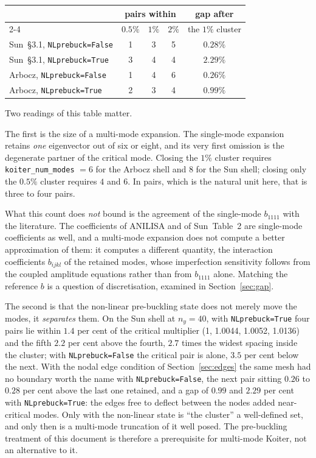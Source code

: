 \documentclass[11pt,a4paper]{article}
\begin{document}
\begin{center}
\begin{tabular}{lcccc}
\toprule
 & \multicolumn{3}{c}{pairs within} & gap after \\
\cmidrule(lr){2-4}
 & $0.5\%$ & $1\%$ & $2\%$ & the $1\%$ cluster \\
\midrule
Sun~\S3.1, \texttt{NLprebuck=False}    & 1 & 3 & 5 & $0.28\%$ \\
Sun~\S3.1, \texttt{NLprebuck=True}     & 3 & 4 & 4 & $2.29\%$ \\
Arbocz, \texttt{NLprebuck=False}       & 1 & 4 & 6 & $0.26\%$ \\
Arbocz, \texttt{NLprebuck=True}        & 2 & 3 & 4 & $0.99\%$ \\
\bottomrule
\end{tabular}
\end{center}

Two readings of this table matter.

The first is the size of a multi-mode expansion.  The single-mode expansion
retains \emph{one} eigenvector out of six or eight, and its very first
omission is the degenerate partner of the critical mode.  Closing the $1\%$
cluster requires \texttt{koiter\_num\_modes} $= 6$ for the Arbocz shell and
$8$ for the Sun shell; closing only the $0.5\%$ cluster requires $4$ and $6$.
In pairs, which is the natural unit here, that is three to four pairs.

What this count does \emph{not} bound is the agreement of the single-mode
$b_{1111}$ with the literature.  The coefficients of ANILISA and of Sun~Table~2
are single-mode coefficients as well, and a multi-mode expansion does not
compute a better approximation of them: it computes a different quantity, the
interaction coefficients $b_{ijkl}$ of the retained modes, whose
imperfection sensitivity follows from the coupled amplitude equations rather
than from $b_{1111}$ alone.  Matching the reference $b$ is a question of
discretisation, examined in Section~\ref{sec:gap}.

The second is that the non-linear pre-buckling state does not merely move the
modes, it \emph{separates} them.  On the Sun shell at $n_y = 40$, with
\texttt{NLprebuck=True} four pairs lie within $1.4$ per cent of the critical
multiplier (1, 1.0044, 1.0052, 1.0136) and the fifth $2.2$ per cent above the
fourth, $2.7$ times the widest spacing inside the cluster; with
\texttt{NLprebuck=False} the critical pair is alone, $3.5$ per cent below the
next.  With the nodal edge condition of Section~\ref{sec:edges} the same mesh
had no boundary worth the name with \texttt{NLprebuck=False}, the next pair
sitting $0.26$ to $0.28$ per cent above the last one retained, and a gap of
$0.99$ and $2.29$ per cent with \texttt{NLprebuck=True}: the edges free to
deflect between the nodes added near-critical modes.  Only with the
non-linear state is ``the cluster'' a well-defined set, and only then is a
multi-mode truncation of it well posed.  The pre-buckling treatment of this document is
therefore a prerequisite for multi-mode Koiter, not an alternative to it.
\end{document}
